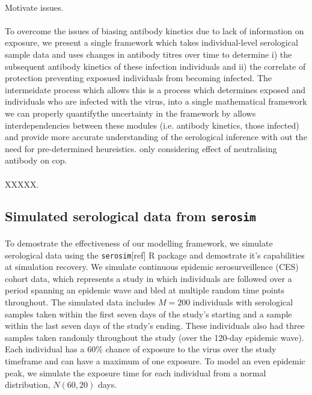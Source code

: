\documentclass{article}
\begin{document}
\paragraph{}Motivate issues.

\paragraph{}To overcome the issues of biasing antibody kinetics due to lack of information on exposure, we present a single framework which takes individual-level serological sample data and uses changes in antibody titres over time to determine i) the subsequent antibody kinetics of these infection individuals and ii) the correlate of protection preventing exposued individuals from becoming infected. The intermeidate process which allows this is a process which determines exposed and individuals who are infected with the virus, into a single mathematical framework we can properly quantifythe uncertainty in the framework by allows interdependencies between these modules (i.e. antibody kinetics, those infected) and provide more accurate understanding of the serological inference with out the need for pre-determined heureistics. only considering effect of neutralising antibody on cop.

\paragraph{}XXXXX.

\subsection{Simulated serological data from \texttt{serosim}}

\paragraph{}To demostrate the effectiveness of our modelling framework, we simulate serological data using the \texttt{serosim}[ref] R package and demostrate it's capabilities at simulation recovery. We simulate continuous epidemic serosurveillence (CES) cohort data, which represents a study in which individuals are followed over a period spanning an epidemic wave and bled at multiple random time points throughout. The simulated data includes $ M = 200$ individuals with serological samples taken within the first seven days of the study's starting and a sample within the last seven days of the study's ending. These individuals also had three samples taken randomly throughout the study (over the 120-day epidemic wave). Each individual has a 60\% chance of exposure to the virus over the study timeframe and can have a maximum of one exposure. To model an even epidemic peak, we simulate the exposure time for each individual from a normal distribution, $N(60, 20)$ days.%
\end{document}
